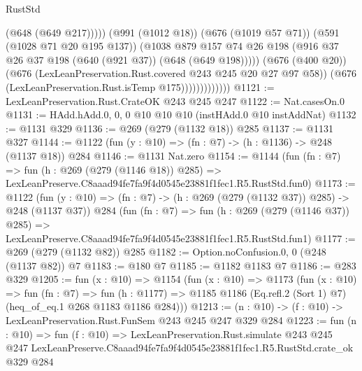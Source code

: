 \begin{lexlean}{RustStd}
\begin{coremodule}
                                  (@648 (@649 @217)))))
                            (@991 (@1012 @18))
                            (@676 (@1019 @57 @71))
                            (@591 (@1028 @71 @20 @195 @137))
                            (@1038
                              @879
                              @157
                              @74
                              @26
                              @198
                              (@916 @37 @26 @37 @198 (@640 (@921 @37)) (@648 (@649 @198)))))
                          (@676 (@400 @20))
                          (@676 (LexLeanPreservation.Rust.covered @243 @245 @20 @27 @97 @58))
                          (@676 (LexLeanPreservation.Rust.isTemp @175)))))))))))))
@1121 := LexLeanPreservation.Rust.CrateOK @243 @245 @247
@1122 := Nat.casesOn.{0}
@1131 := HAdd.hAdd.{0, 0, 0} @10 @10 @10 (instHAdd.{0} @10 instAddNat)
@1132 := @1131 @329
@1136 := @269 (@279 (@1132 @18)) @285
@1137 := @1131 @327
@1144 := @1122 (fun (y : @10) => (fn : @7) -> (h : @1136) -> @248 (@1137 @18)) @284
@1146 := @1131 Nat.zero
@1154 := @1144
    (fun (fn : @7) =>
    fun (h : @269 (@279 (@1146 @18)) @285) =>
    LexLeanPreserve.C8aaad94fe7fa9f4d0545e23881f1fec1.R5.RustStd.fun0)
@1173 := @1122
    (fun (y : @10) => (fn : @7) -> (h : @269 (@279 (@1132 @37)) @285) -> @248 (@1137 @37))
    @284
    (fun (fn : @7) =>
    fun (h : @269 (@279 (@1146 @37)) @285) =>
    LexLeanPreserve.C8aaad94fe7fa9f4d0545e23881f1fec1.R5.RustStd.fun1)
@1177 := @269 (@279 (@1132 @82)) @285
@1182 := Option.noConfusion.{0, 0} (@248 (@1137 @82)) @7
@1183 := @180 @7
@1185 := @1182 @1183 @7
@1186 := @283 @329
@1205 := fun (x : @10) =>
  @1154
    (fun (x : @10) =>
    @1173
      (fun (x : @10) =>
      fun (fn : @7) =>
      fun (h : @1177) =>
      @1185 @1186 (Eq.refl.{2} (Sort 1) @7) (heq_of_eq.{1} @268 @1183 @1186 @284)))
@1213 := (n : @10) -> (f : @10) -> LexLeanPreservation.Rust.FunSem @243 @245 @247 @329 @284
@1223 := fun (n : @10) =>
  fun (f : @10) =>
  LexLeanPreservation.Rust.simulate
    @243
    @245
    @247
    LexLeanPreserve.C8aaad94fe7fa9f4d0545e23881f1fec1.R5.RustStd.crate_ok
    @329
    @284
\end{coremodule}
\end{lexlean}
